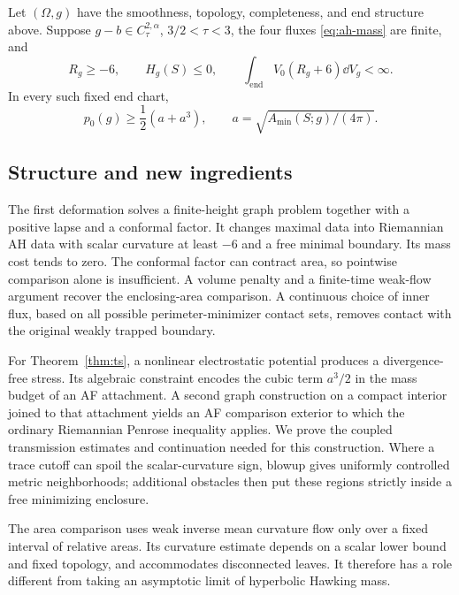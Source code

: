 \begin{theorem}\label{thm:ts}
Let $(\Omega,g)$ have the smoothness, topology, completeness, and end
structure above. Suppose $g-b\in C^{2,\alpha}_\tau$, $3/2<\tau<3$,
the four fluxes \eqref{eq:ah-mass} are finite, and
\[
 R_g\ge-6,\qquad H_g(S)\le0,
 \qquad \int_{\mathrm{end}}V_0(R_g+6)\dd V_g<\infty.
\]
In every such fixed end chart,
\begin{equation}\label{eq:ts-inequality}
 p_0(g)\ge\frac12(a+a^3),
 \qquad a=\sqrt{A_{\min}(S;g)/(4\pi)}.
\end{equation}
\end{theorem}

\subsection{Structure and new ingredients}

The first deformation solves a finite-height graph problem together
with a positive lapse and a conformal factor. It changes maximal data
into Riemannian AH data with scalar curvature at least $-6$ and a free
minimal boundary. Its mass cost tends to zero. The conformal factor
can contract area, so pointwise comparison alone is insufficient.
A volume penalty and a finite-time weak-flow argument recover the
enclosing-area comparison. A continuous choice of inner flux, based
on all possible perimeter-minimizer contact sets, removes contact with
the original weakly trapped boundary.

For Theorem~\ref{thm:ts}, a nonlinear electrostatic potential produces a
divergence-free stress. Its algebraic constraint encodes the cubic
term $a^3/2$ in the mass budget of an AF attachment. A second graph
construction on a compact interior joined to that attachment yields
an AF comparison exterior to which the ordinary Riemannian Penrose
inequality applies. We prove the coupled transmission estimates and
continuation needed for this construction. Where a trace cutoff can
spoil the scalar-curvature sign, blowup gives uniformly controlled
metric neighborhoods; additional obstacles then put these regions
strictly inside a free minimizing enclosure.

The area comparison uses weak inverse mean curvature flow only over
a fixed interval of relative areas. Its curvature estimate depends on
a scalar lower bound and fixed topology, and accommodates disconnected
leaves. It therefore has a role different from taking an asymptotic
limit of hyperbolic Hawking mass.

